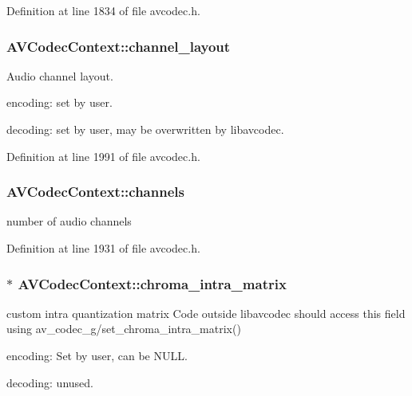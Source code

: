 Definition at line 1834 of file avcodec.\+h.

\subsubsection[{\texorpdfstring{channel\+\_\+layout}{channel_layout}}]{ A\+V\+Codec\+Context\+::channel\+\_\+layout}\hypertarget{struct_a_v_codec_context_aeb08c575a79eb84fc4155dda88f46c06}{}\label{struct_a_v_codec_context_aeb08c575a79eb84fc4155dda88f46c06}
Audio channel layout.
\begin{DoxyItemize}
\item encoding\+: set by user.
\item decoding\+: set by user, may be overwritten by libavcodec. 
\end{DoxyItemize}

Definition at line 1991 of file avcodec.\+h.

\subsubsection[{\texorpdfstring{channels}{channels}}]{ A\+V\+Codec\+Context\+::channels}\hypertarget{struct_a_v_codec_context_ac1e6c2cd1269caa7570575725c682a49}{}\label{struct_a_v_codec_context_ac1e6c2cd1269caa7570575725c682a49}


number of audio channels 



Definition at line 1931 of file avcodec.\+h.

\subsubsection[{\texorpdfstring{chroma\+\_\+intra\+\_\+matrix}{chroma_intra_matrix}}]{$\ast$ A\+V\+Codec\+Context\+::chroma\+\_\+intra\+\_\+matrix}\hypertarget{struct_a_v_codec_context_a0a285528f0f1ad5c9d639f427839e5d3}{}\label{struct_a_v_codec_context_a0a285528f0f1ad5c9d639f427839e5d3}
custom intra quantization matrix Code outside libavcodec should access this field using av\+\_\+codec\+\_\+g/set\+\_\+chroma\+\_\+intra\+\_\+matrix()
\begin{DoxyItemize}
\item encoding\+: Set by user, can be N\+U\+LL.
\item decoding\+: unused. 
\end{DoxyItemize}


